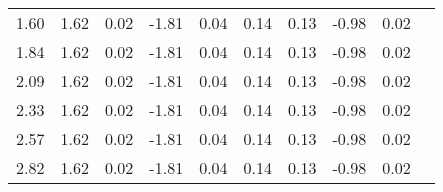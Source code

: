 \begin{tabular}{rrrrrrrrrr}
 1.60 &     1.62 &     0.02  &    -1.81 &      0.04 &      0.14 &      0.13 &     -0.98 &      0.02 \\ 
 1.84 &     1.62 &     0.02  &    -1.81 &      0.04 &      0.14 &      0.13 &     -0.98 &      0.02 \\ 
 2.09 &     1.62 &     0.02  &    -1.81 &      0.04 &      0.14 &      0.13 &     -0.98 &      0.02 \\ 
 2.33 &     1.62 &     0.02  &    -1.81 &      0.04 &      0.14 &      0.13 &     -0.98 &      0.02 \\ 
 2.57 &     1.62 &     0.02  &    -1.81 &      0.04 &      0.14 &      0.13 &     -0.98 &      0.02 \\ 
 2.82 &     1.62 &     0.02  &    -1.81 &      0.04 &      0.14 &      0.13 &     -0.98 &      0.02 \\ \hline 
\end{tabular}
